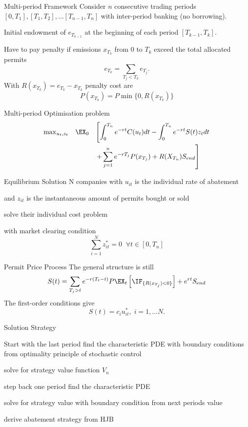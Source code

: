 Multi-period Framework
	Consider $n$ consecutive trading periods $[0,T_1], [T_1, T_2], \ldots [T_{n-1}, T_n]$ with inter-period banking (no borrowing).
	
	Initial endowment of $e_{T_{k-1}}$ at the beginning of each period $[T_{k-1}, T_k]$.
	
	Have to pay penalty if emissions $x_{T_k}$ from $0$ to $T_k$ exceed the total allocated permits
		$$
		e_{T_k}= \sum_{T_j < T_k}e_{T_j}.
		$$
	With $R(x_{T_k})=e_{T_k}-x_{T_k}$ penalty cost are
		$$
		P(x_{T_k}) = P \min\{0, R(x_{T_k})\}
		$$


Multi-period Optimisation problem
	$$
	\begin{array}{lll}
	\max_{u_t, z_t} & \EX_0& \left[ \displaystyle\int_0^{T_n}e^{-rt}C(u_t)dt - \int_0^{T_n}e^{-rt}S(t) z_tdt \right. \\*[12pt]
	& & \displaystyle \left. + \sum_{j=1}^n e^{-rT_j}P(x_{T_j}) + R(X_{T_n}) S_{end}\right]
	\end{array}
	$$

Equilibrium Solution
	N companies with
		$u_{it}$ is the individual rate of abatement
	
		and $z_{it}$ is the instantaneous amount of permits bought or sold
		
		solve their individual cost problem
		
		with market clearing condition
			$$
			\sum_{i=1}^N z_{it}^*=0 \;\;  \forall t \in [0, T_n]
			$$


Permit Price Process
	The general structure is still
		$$
		S(t) = \sum_{T_j >t} e^{-r(T_t-t)} P \EX_t\left[\IF_{\{R(x_{T_j})<0\}}\right] + e^{rt} S_{end}
		$$
	The first-order conditions give
		$$
		S(t) = c_i u_{it}^*, \; i=1, \ldots N.
		$$


Solution Strategy

 Start with the last period
		find the characteristic PDE with boundary conditions from optimality principle of stochastic control
		
		solve for strategy value function $V_n$

	step back one period
		find the characteristic PDE
 
		solve for strategy value with boundary condition from next periods value

	derive abatement strategy from HJB

